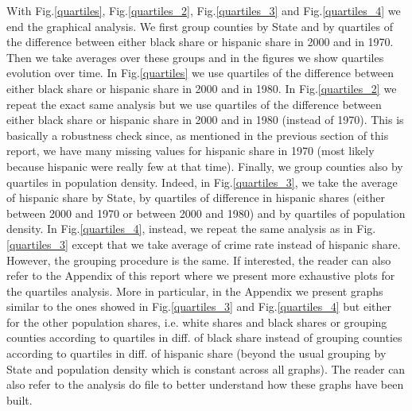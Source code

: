 \documentclass[a4paper,12pt]{article}
\begin{document}
\noindent
With Fig.\ref{quartiles}, Fig.\ref{quartiles_2}, Fig.\ref{quartiles_3} and Fig.\ref{quartiles_4} we end the graphical analysis. We first group counties by State and by quartiles of the difference between either black share or hispanic share in 2000 and in 1970. Then we take averages over these groups and in the figures we show quartiles evolution over time. In Fig.\ref{quartiles} we use quartiles of the difference between either black share or hispanic share in 2000 and in 1980. In Fig.\ref{quartiles_2} we repeat the exact same analysis but we use quartiles of the difference between either black share or hispanic share in 2000 and in 1980 (instead of 1970). This is basically a robustness check since, as mentioned in the previous section of this report, we have many missing values for hispanic share in 1970 (most likely because hispanic were really few at that time). Finally, we group counties also by quartiles in population density. Indeed, in Fig.\ref{quartiles_3}, we take the average of hispanic share by State, by quartiles of difference in hispanic shares (either between 2000 and 1970 or between 2000 and 1980) and by quartiles of population density. In Fig.\ref{quartiles_4}, instead, we repeat the same analysis as in Fig.\ref{quartiles_3} except that we take average of crime rate instead of hispanic share. However, the grouping procedure is the same. If interested, the reader can also refer to the Appendix of this report where we present more exhaustive plots for the quartiles analysis. More in particular, in the Appendix we present graphs similar to the ones showed in Fig.\ref{quartiles_3} and Fig.\ref{quartiles_4} but either for the other population shares, i.e. white shares and black shares or grouping counties according to quartiles in diff. of black share instead of grouping counties according to quartiles in diff. of hispanic share (beyond the usual grouping by State and population density which is constant across all graphs). The reader can also refer to the analysis do file to better understand how these graphs have been built. 
\end{document}
